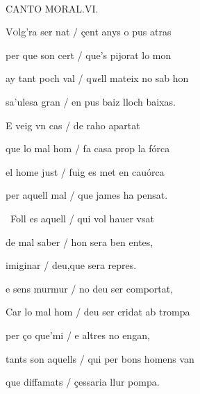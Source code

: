 \documentclass[12pt]{article}
\renewcommand{\espaiAbansEtiquetaPoema}{\vspace{0ex}}
\begin{document}
\begin{estrofa}

\espaiAbansEtiquetaPoema

\\

\begin{rubrica}

\pagina{[148r]} CANTO MORAL.VI.

\end{rubrica}

\end{estrofa}


\begin{estrofa}

 V\textsc{o}lg'ra ser nat / \c{c}ent anys o pus atras

 per que son cert / que's pijorat lo mon

 ay tant poch val / q\textit{ue}ll mateix no sab hon

 sa'ulesa gran / en pus baiz lloch baixas.

 E veig vn cas / de raho apartat

 que lo mal hom / fa casa prop la f\'{o}rca

 el home just / fuig es met en cau\'{o}rca

 per aquell mal / que james ha pensat.

\end{estrofa}



\begin{estrofa}

 \textparagraph\  Foll es aquell / qui vol hauer vsat

 de mal saber / hon sera ben entes,

 imiginar / deu,que sera repres.

 e sens murmur / no deu ser comportat,

 Car lo mal hom / deu ser cridat ab trompa

 per \c{c}o que'mi / e altres no engan,

 tants son aquells / qui per bons homens van

 que diffamats / \c{c}essaria llur pompa.

\end{estrofa}
\end{document}
